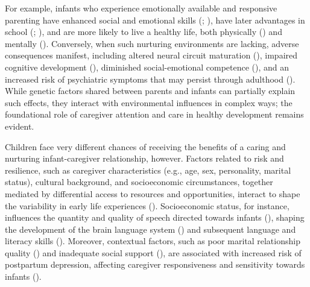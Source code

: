 \documentclass[
]{article}
\begin{document}
For example, infants who experience emotionally available and responsive
parenting have enhanced social and emotional skills
(;
), have later advantages
in school (;
), and are
more likely to live a healthy life, both physically
() and mentally
(). Conversely, when such
nurturing environments are lacking, adverse consequences manifest,
including altered neural circuit maturation (), impaired cognitive development
(), diminished
social-emotional competence (), and an increased risk of psychiatric symptoms that may persist
through adulthood ().
While genetic factors shared between parents and infants can partially
explain such effects, they interact with environmental influences in
complex ways; the foundational role of caregiver attention and care in
healthy development remains evident.

Children face very different chances of receiving the benefits of a
caring and nurturing infant-caregiver relationship, however. Factors
related to risk and resilience, such as caregiver characteristics (e.g.,
age, sex, personality, marital status), cultural background, and
socioeconomic circumstances, together mediated by differential access to
resources and opportunities, interact to shape the variability in early
life experiences ().
Socioeconomic status, for instance, influences the quantity and quality
of speech directed towards infants (), shaping the development of the brain language system
() and subsequent
language and literacy skills (). Moreover, contextual factors, such as poor marital
relationship quality ()
and inadequate social support (), are associated with increased risk of postpartum depression,
affecting caregiver responsiveness and sensitivity towards infants
().
\end{document}
